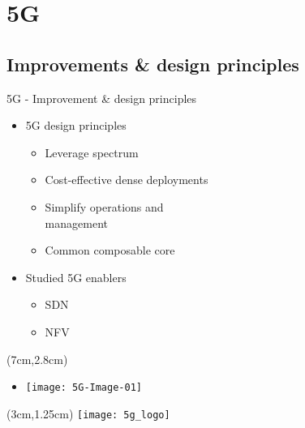 \section{5G}
\subsection*{Improvements \& design principles}
\begin{frame}{5G - Improvement \& design principles}

  \begin{itemize}
    \item[]<1-> 5G design principles
      \begin{itemize}
      \item<2-> Leverage spectrum
      \item<3-> Cost-effective dense deployments
      \item<4-> Simplify operations and \\ management
      \item<5-> Common composable core
      \end{itemize}
  \end{itemize}

  \begin{itemize}
    \item[]<6-> Studied 5G enablers
      \begin{itemize}
      \item<7-> SDN
      \item<8-> NFV
      \end{itemize}
  \end{itemize}


  \begin{textblock*}{5cm}(7cm,2.8cm)
    \begin{itemize}
      \item[]<6-> \texttt{[image: 5G-Image-01]}
    \end{itemize}
  \end{textblock*}

  \begin{textblock*}{5cm}(3cm,1.25cm)
    \texttt{[image: 5g\_logo]}
  \end{textblock*}
\end{frame}
